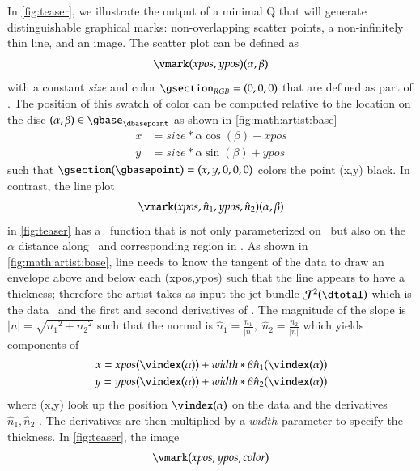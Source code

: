 \documentclass[journal]{vgtc}                %
\begin{document}
In \autoref{fig:teaser}, we illustrate the output of a minimal Q that will generate distinguishable graphical marks: non-overlapping scatter points, a non-infinitely thin line, and an image. The scatter plot can be defined as 
\begin{equation}
\vmark(xpos, ypos)(\alpha, \beta)
\label{eq:math:artist:q:scatter}
\end{equation}
with a constant \textit{size} and color $\gsection_{RGB} = (0,0,0)$ that are defined as part of \vmark. The position of this swatch of color can be computed relative to the location on the disc \((\alpha, \beta) \in \gbase_{\dbasepoint}\) as shown in \autoref{fig:math:artist:base}
\begin{align*}
x &= size *\alpha \cos(\beta) + xpos \\
y &= size *\alpha \sin(\beta) + ypos
\end{align*}
such that $\gsection(\gbasepoint) = (x, y, 0, 0, 0)$ colors the point (x,y) black. 
In contrast, the line plot 
\begin{equation}
\vmark(xpos, \hat{n}_{1}, ypos, \hat{n}_{2})(\alpha, \beta)
\label{eq:math:artist:q:line}
\end{equation}
in \autoref{fig:teaser} has a \vindex\ function that is not only parameterized on \dbasepoint\ but also on the $\alpha$ distance along \dbasepoint\ and corresponding region in \gbase. As shown in \autoref{fig:math:artist:base}, line needs to know the tangent of the data to draw an envelope above and below each (xpos,ypos) such that the line appears to have a thickness; therefore the artist takes as input the jet bundle \cite{JetBundle2020,musilovaCalculusVariationsJet2016} $\mathcal{J}^{2}(\dtotal)$ which is the data \dtotal\ and the first and second derivatives of \dtotal. The magnitude of the slope is $\lvert n \rvert = \sqrt{{n_{1}}^2 + {n_{2}}^2}$
such that the normal is  $\hat{n}_{1} = \frac{n_1}{\lvert n \rvert}, \; \hat{n}_{2} = \frac{n_2}{\lvert n \rvert}$ which yields components of \gsection\
\begin{align*}
 x = xpos(\vindex(\alpha)) &+ width*\beta\hat{n}_1(\vindex(\alpha)) \\
 y = ypos(\vindex(\alpha)) &+ width*\beta\hat{n}_2(\vindex(\alpha)) 
\end{align*}
where (x,y) look up the position $\vindex(\alpha)$ on the data and the derivatives $\hat{n}_1, \hat{n}_2$ . The derivatives are then multiplied by a $width$ parameter to specify the thickness.
In \autoref{fig:teaser}, the image 
\begin{equation}
\vmark(xpos, ypos, color)
\label{eq:math:artist:q:image}
\end{equation}
\end{document}
